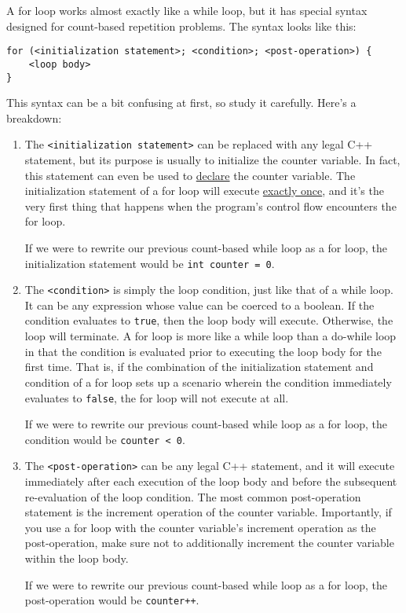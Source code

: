 \documentclass{article}
\begin{document}
A for loop works almost exactly like a while loop, but it has special syntax designed for count-based repetition problems. The syntax looks like this:

\begin{verbatim}
for (<initialization statement>; <condition>; <post-operation>) {
    <loop body>
}
\end{verbatim}

This syntax can be a bit confusing at first, so study it carefully. Here's a breakdown:

\begin{enumerate}
    \item The \texttt{<initialization statement>} can be replaced with any legal C++ statement, but its purpose is usually to initialize the counter variable. In fact, this statement can even be used to \ul{declare} the counter variable. The initialization statement of a for loop will execute \ul{exactly once}, and it's the very first thing that happens when the program's control flow encounters the for loop.
    
    If we were to rewrite our previous count-based while loop as a for loop, the initialization statement would be \texttt{int counter = 0}.
    
    \item The \texttt{<condition>} is simply the loop condition, just like that of a while loop. It can be any expression whose value can be coerced to a boolean. If the condition evaluates to \texttt{true}, then the loop body will execute. Otherwise, the loop will terminate. A for loop is more like a while loop than a do-while loop in that the condition is evaluated prior to executing the loop body for the first time. That is, if the combination of the initialization statement and condition of a for loop sets up a scenario wherein the condition immediately evaluates to \texttt{false}, the for loop will not execute at all.

    If we were to rewrite our previous count-based while loop as a for loop, the condition would be \texttt{counter < 0}.

    \item The \texttt{<post-operation>} can be any legal C++ statement, and it will execute immediately after each execution of the loop body and before the subsequent re-evaluation of the loop condition. The most common post-operation statement is the increment operation of the counter variable. Importantly, if you use a for loop with the counter variable's increment operation as the post-operation, make sure not to additionally increment the counter variable within the loop body.

    If we were to rewrite our previous count-based while loop as a for loop, the post-operation would be \texttt{counter++}.
\end{enumerate}
\end{document}
